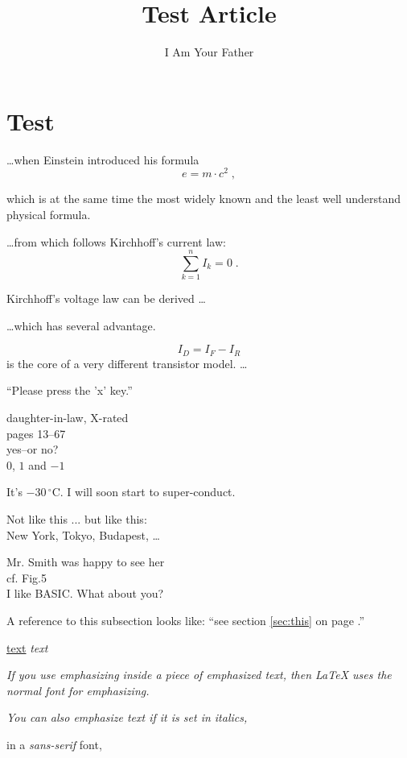 \documentclass[UTF8]{article}
\author{I Am Your Father}
\title{Test Article}
\begin{document}
	
	\section{Test}
	\ldots when Einstein introduced his formula
	\begin{equation}
		e = m \cdot c^2 \; , 
	\end{equation}

	which is at the same time the most widely known and the least well understand physical formula. 
	
	\ldots from which follows Kirchhoff's current law:
	\begin{equation}
		\sum_{k=1}^{n} I_k =0 \; .
	\end{equation}

	Kirchhoff's voltage law can be derived \ldots 
	
	
	\ldots which has several advantage. 
	
	\begin{equation}
		I_D = I_F - I_R 
	\end{equation}
	is the core of a very different transistor model. \ldots 
	
	``Please press the 'x' key.''
	
	daughter-in-law, X-rated\\
	pages 13--67\\
	yes--or no? \\
	$0$, $1$ and $-1$
	
	It's $-30\,^{\circ} \mathrm{C}$.
	I will soon start to super-conduct. 
	
	Not like this ... but like this:\\ New York, Tokyo, 
	Budapest, \ldots
	
	Mr. Smith was happy to see her\\
	cf. Fig.5 \\
	I like BASIC\@. What about you?\par 
	\par
	
	A reference to this subsection \label{sec:this} looks like:
	``see section \ref{sec:this} on page \pageref{sec:this}	.''
	
	\underline{text}
	\emph{text}
	
	\emph{If you use emphasizing inside a piece of emphasized text, then \LaTeX{} uses the \emph{normal} font for emphasizing. }
	
	\textit{You can also \emph{emphasize} text if it is set in italics,}
	

	\textsf{ in a \emph{ sans-serif} font,}
	
\end{document}
